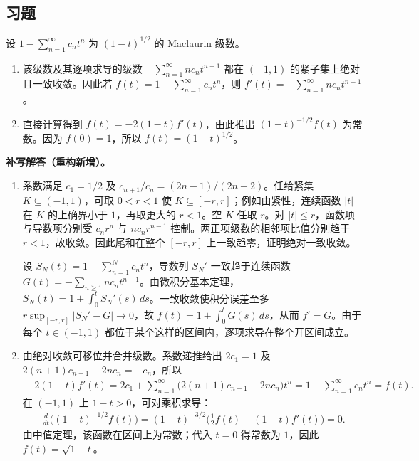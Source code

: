 \documentclass[../../main.tex]{subfiles}%
\begin{document}
\subsection*{习题}
\begin{exercise}\label{exercise:ch04-square-root-series}
设 $1-\sum_{n=1}^{\infty}c_nt^n$ 为 $(1-t)^{1/2}$ 的 Maclaurin 级数。
\begin{enumerate}
\item\label{item:ch04-square-root-series-differentiation} 该级数及其逐项求导的级数 $-\sum_{n=1}^{\infty}nc_nt^{n-1}$ 都在 $(-1,1)$ 的紧子集上绝对且一致收敛。因此若 $f(t)=1-\sum_{n=1}^{\infty}c_nt^n$，则 $f'(t)=-\sum_{n=1}^{\infty}nc_nt^{n-1}$。
\item\label{item:ch04-square-root-series-identity} 直接计算得到 $f(t)=-2(1-t)f'(t)$，由此推出 $(1-t)^{-1/2}f(t)$ 为常数。因为 $f(0)=1$，所以 $f(t)=(1-t)^{1/2}$。
\end{enumerate}
\end{exercise}
\begin{solution}
\textbf{补写解答（重构新增）。}
\begin{enumerate}
\item 系数满足 $c_1=1/2$ 及 $c_{n+1}/c_n=(2n-1)/(2n+2)$。任给紧集 $K\subseteq(-1,1)$，可取 $0<r<1$ 使 $K\subseteq[-r,r]$；例如由紧性，连续函数 $|t|$ 在 $K$ 的上确界小于 $1$，再取更大的 $r<1$。空 $K$ 任取 $r$。对 $|t|\le r$，函数项与导数项分别受 $c_nr^n$ 与 $nc_nr^{n-1}$ 控制。两正项级数的相邻项比值分别趋于 $r<1$，故收敛。因此尾和在整个 $[-r,r]$ 上一致趋零，证明绝对一致收敛。

设 $S_N(t)=1-\sum_{n=1}^Nc_nt^n$，导数列 $S_N'$ 一致趋于连续函数 $G(t)=-\sum_{n\ge1}nc_nt^{n-1}$。由微积分基本定理，$S_N(t)=1+\int_0^tS_N'(s)\,ds$。一致收敛使积分误差至多 $r\sup_{[-r,r]}|S_N'-G|\to0$，故 $f(t)=1+\int_0^tG(s)\,ds$，从而 $f'=G$。由于每个 $t\in(-1,1)$ 都位于某个这样的区间内，逐项求导在整个开区间成立。
\item 由绝对收敛可移位并合并级数。系数递推给出 $2c_1=1$ 及 $2(n+1)c_{n+1}-2nc_n=-c_n$，所以
\begin{align*}
-2(1-t)f'(t)
=2c_1+\sum_{n=1}^{\infty}\bigl(2(n+1)c_{n+1}-2nc_n\bigr)t^n
=1-\sum_{n=1}^{\infty}c_nt^n=f(t).
\end{align*}
在 $(-1,1)$ 上 $1-t>0$，可对乘积求导：
\begin{align*}
\frac{d}{dt}\bigl((1-t)^{-1/2}f(t)\bigr)
=(1-t)^{-3/2}\bigl(\tfrac12 f(t)+(1-t)f'(t)\bigr)=0.
\end{align*}
由中值定理，该函数在区间上为常数；代入 $t=0$ 得常数为 $1$，因此 $f(t)=\sqrt{1-t}$。
\end{enumerate}
\end{solution}
\end{document}

